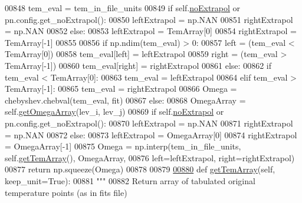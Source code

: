 \begin{DoxyCode}
{{00848             tem\_eval = tem\_in\_file\_units
00849             \textcolor{keywordflow}{if} self.\hyperlink{classpyneb_1_1core_1_1pynebcore_1_1___coll_data_fits_a97b30abb66948d40dc2077a3c3b15231}{noExtrapol} \textcolor{keywordflow}{or} pn.config.get\_noExtrapol():
00850                 leftExtrapol = np.NAN
00851                 rightExtrapol = np.NAN
00852             \textcolor{keywordflow}{else}:
00853                 leftExtrapol = TemArray[0]
00854                 rightExtrapol = TemArray[-1]
00855             
00856             \textcolor{keywordflow}{if} np.ndim(tem\_eval) > 0:
00857                 left = (tem\_eval < TemArray[0])
00858                 tem\_eval[left] = leftExtrapol
00859                 right = (tem\_eval > TemArray[-1])
00860                 tem\_eval[right] = rightExtrapol
00861             \textcolor{keywordflow}{else}:
00862                 \textcolor{keywordflow}{if} tem\_eval < TemArray[0]:
00863                     tem\_eval = leftExtrapol
00864                 \textcolor{keywordflow}{elif} tem\_eval > TemArray[-1]:
00865                     tem\_eval = rightExtrapol
00866             Omega = chebyshev.chebval(tem\_eval, fit)
00867         \textcolor{keywordflow}{else}:
00868             OmegaArray = self.\hyperlink{classpyneb_1_1core_1_1pynebcore_1_1___coll_data_fits_acca4425c4b7d2e08d0b1b9fe6e1846a7}{getOmegaArray}(lev\_i, lev\_j)
00869             \textcolor{keywordflow}{if} self.\hyperlink{classpyneb_1_1core_1_1pynebcore_1_1___coll_data_fits_a97b30abb66948d40dc2077a3c3b15231}{noExtrapol} \textcolor{keywordflow}{or} pn.config.get\_noExtrapol():
00870                 leftExtrapol = np.NAN
00871                 rightExtrapol = np.NAN
00872             \textcolor{keywordflow}{else}:
00873                 leftExtrapol = OmegaArray[0]
00874                 rightExtrapol = OmegaArray[-1]
00875             Omega = np.interp(tem\_in\_file\_units, self.\hyperlink{classpyneb_1_1core_1_1pynebcore_1_1___coll_data_fits_a6b53fa73abb34d16f1066dc52604f25c}{getTemArray}(), OmegaArray,
00876                               left=leftExtrapol, right=rightExtrapol)
00877         \textcolor{keywordflow}{return} np.squeeze(Omega)
00878 
00879 
\hypertarget{pynebcore_8py_source_l00880}{}\hyperlink{classpyneb_1_1core_1_1pynebcore_1_1___coll_data_fits_a6b53fa73abb34d16f1066dc52604f25c}{00880}     \textcolor{keyword}{def }\hyperlink{classpyneb_1_1core_1_1pynebcore_1_1___coll_data_fits_a6b53fa73abb34d16f1066dc52604f25c}{getTemArray}(self, keep\_unit=True):
00881         \textcolor{stringliteral}{"""}
00882 \textcolor{stringliteral}{        Return array of tabulated original temperature points (as in fits file) }
}}
\end{DoxyCode}
